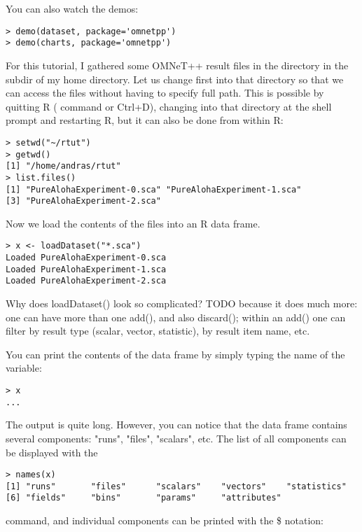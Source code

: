 You can also watch the demos:

\begin{verbatim}
> demo(dataset, package='omnetpp')
> demo(charts, package='omnetpp')
\end{verbatim}

For this tutorial, I gathered some OMNeT++ result files in the directory 
in the  subdir of my home directory. Let us change first into that 
directory so that we can access the files without having to specify 
full path. This is possible by quitting R ( command or Ctrl+D), 
changing into that directory at the shell prompt and restarting R, 
but it can also be done from within R:

\begin{verbatim}
> setwd("~/rtut")
> getwd()
[1] "/home/andras/rtut"
> list.files()
[1] "PureAlohaExperiment-0.sca" "PureAlohaExperiment-1.sca"
[3] "PureAlohaExperiment-2.sca"
\end{verbatim}

Now we load the contents of the files into an R data frame.

\begin{verbatim}
> x <- loadDataset("*.sca")
Loaded PureAlohaExperiment-0.sca
Loaded PureAlohaExperiment-1.sca
Loaded PureAlohaExperiment-2.sca
\end{verbatim}

Why does loadDataset() look so complicated?  TODO because it does much more:
one can have more than one add(), and also discard(); within an add() one can
filter by result type (scalar, vector, statistic), by result item name, etc.

You can print the contents of the data frame by simply typing the name of the variable:

\begin{verbatim}
> x
...
\end{verbatim}

The output is quite long. However, you can notice that the data frame contains several components:
"runs", "files", "scalars", etc. The list of all components can be displayed with the

\begin{verbatim}
> names(x)
[1] "runs"       "files"      "scalars"    "vectors"    "statistics"
[6] "fields"     "bins"       "params"     "attributes"
\end{verbatim}

command, and individual components can be printed with the \$ notation:


